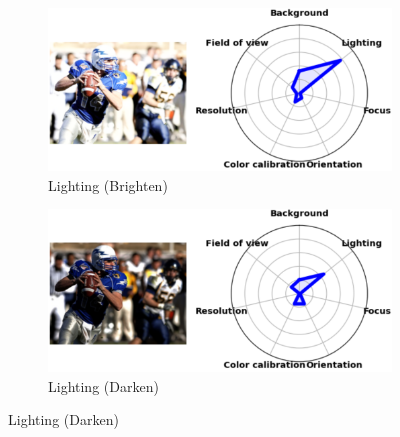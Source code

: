 \begin{figure}[ht]
    \begin{subfigure}[b]{0.48\textwidth}
        \includegraphics[width=\textwidth]{img/ood/4l.png}
        \caption{Lighting (Brighten)}
        \label{fig:4l}
    \end{subfigure}
    \hfill
    \begin{subfigure}[b]{0.48\textwidth}
        \includegraphics[width=\textwidth]{img/ood/4ll.png}
        \caption{Lighting (Darken)}
        \label{fig:4ll}
    \end{subfigure}


\end{figure}
